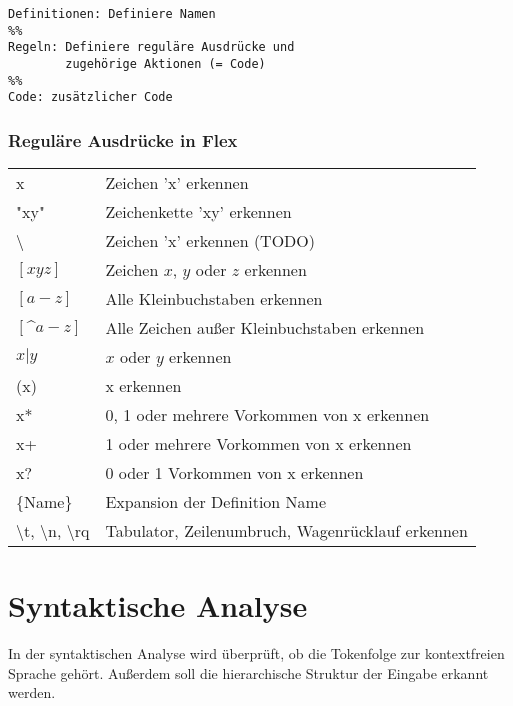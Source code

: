 \begin{verbatim}
Definitionen: Definiere Namen
%%
Regeln: Definiere reguläre Ausdrücke und
        zugehörige Aktionen (= Code)
%%
Code: zusätzlicher Code
\end{verbatim}

\subsubsection{Reguläre Ausdrücke in Flex}
\begin{table}
    \begin{tabular}{ll}
    x          & Zeichen 'x' erkennen                             \\
    "xy"       & Zeichenkette 'xy' erkennen                       \\
    \textbackslash & Zeichen 'x' erkennen (TODO)                      \\
    $[xyz]$    & Zeichen $x$, $y$ oder $z$ erkennen         \\
    $[a-z]$    & Alle Kleinbuchstaben erkennen                    \\
    $[\^a-z]$  & Alle Zeichen außer Kleinbuchstaben erkennen      \\
    $x|y$      & $x$ oder $y$ erkennen                        \\
    (x)        & x erkennen                                       \\
    x*         & 0, 1 oder mehrere Vorkommen von x erkennen       \\
    x+         & 1 oder mehrere Vorkommen von x erkennen          \\
    x?         & 0 oder 1 Vorkommen von x erkennen                \\
    \{Name\}   & Expansion der Definition Name                    \\
    \textbackslash t, \textbackslash n, \textbackslash rq & Tabulator, Zeilenumbruch, Wagenrücklauf erkennen \\
    \end{tabular}
\end{table}



\section{Syntaktische Analyse}%
In der syntaktischen Analyse wird überprüft, ob die Tokenfolge zur
kontextfreien Sprache gehört. Außerdem soll die
hierarchische Struktur der Eingabe erkannt werden.


